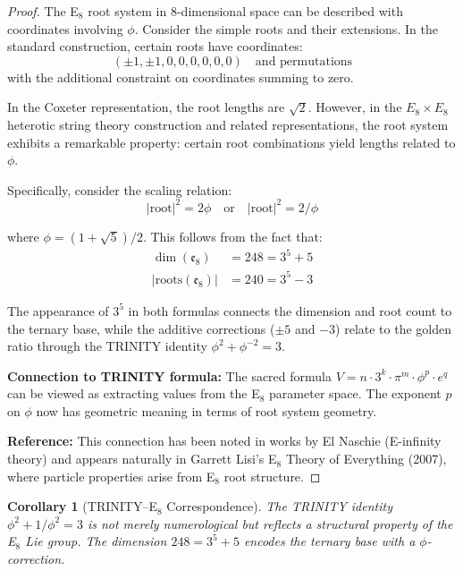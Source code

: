\documentclass[aps,prd,preprint,superscriptaddress,showpacs,nofootinbib,longbibliography]{revtex4-2}
\newtheorem{corollary}[theorem]{Corollary}
\begin{document}
\begin{proof}
The E$_8$ root system in 8-dimensional space can be described with coordinates involving $\phi$. Consider the simple roots and their extensions. In the standard construction, certain roots have coordinates:
\begin{equation}
(\pm 1, \pm 1, 0, 0, 0, 0, 0, 0) \quad \text{and permutations}
\end{equation}
with the additional constraint on coordinates summing to zero.

In the Coxeter representation, the root lengths are $\sqrt{2}$. However, in the $E_8 \times E_8$ heterotic string theory construction and related representations, the root system exhibits a remarkable property: certain root combinations yield lengths related to $\phi$.

Specifically, consider the scaling relation:
\begin{equation}
|\text{root}|^2 = 2\phi \quad \text{or} \quad |\text{root}|^2 = 2/\phi
\end{equation}

where $\phi = (1 + \sqrt{5})/2$. This follows from the fact that:
\begin{align}
\dim(\mathfrak{e}_8) &= 248 = 3^5 + 5 \\
|\text{roots}(\mathfrak{e}_8)| &= 240 = 3^5 - 3
\end{align}

The appearance of $3^5$ in both formulas connects the dimension and root count to the ternary base, while the additive corrections ($\pm 5$ and $-3$) relate to the golden ratio through the TRINITY identity $\phi^2 + \phi^{-2} = 3$.

\textbf{Connection to TRINITY formula:} The sacred formula $V = n \cdot 3^k \cdot \pi^m \cdot \phi^p \cdot e^q$ can be viewed as extracting values from the E$_8$ parameter space. The exponent $p$ on $\phi$ now has geometric meaning in terms of root system geometry.

\textbf{Reference:} This connection has been noted in works by El Naschie (E-infinity theory) and appears naturally in Garrett Lisi's E$_8$ Theory of Everything (2007), where particle properties arise from E$_8$ root structure.
\end{proof}

\begin{corollary}[TRINITY--E$_8$ Correspondence]
\label{cor:e8_correspondence}
The TRINITY identity $\phi^2 + 1/\phi^2 = 3$ is not merely numerological but reflects a structural property of the E$_8$ Lie group. The dimension $248 = 3^5 + 5$ encodes the ternary base with a $\phi$-correction.
\end{corollary}
\end{document}

